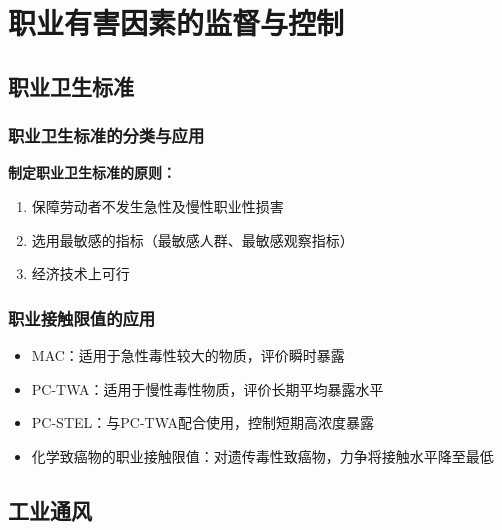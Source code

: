\chapter{职业有害因素的监督与控制}
\setcounter{chapter}{11}

\section{职业卫生标准}

\subsection{职业卫生标准的分类与应用}

\begin{defbox}
\textbf{制定职业卫生标准的原则：}
\begin{enumerate}[leftmargin=*]
    \item 保障劳动者不发生急性及慢性职业性损害
    \item 选用最敏感的指标（最敏感人群、最敏感观察指标）
    \item 经济技术上可行
\end{enumerate}
\end{defbox}

\subsection{职业接触限值的应用}

\begin{itemize}[leftmargin=*]
    \item MAC：适用于急性毒性较大的物质，评价瞬时暴露
    \item PC-TWA：适用于慢性毒性物质，评价长期平均暴露水平
    \item PC-STEL：与PC-TWA配合使用，控制短期高浓度暴露
    \item 化学致癌物的职业接触限值：对遗传毒性致癌物，力争将接触水平降至最低
\end{itemize}

\section{工业通风}

